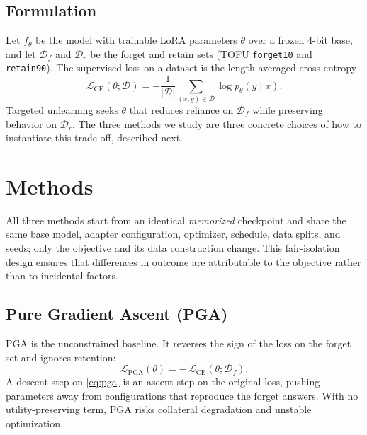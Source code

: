 \documentclass[journal]{IEEEtran}
\begin{document}
\subsection{Formulation}
Let $f_\theta$ be the model with trainable LoRA parameters $\theta$ over a frozen 4-bit base, and let $\mathcal{D}_f$ and $\mathcal{D}_r$ be the forget and retain sets (TOFU \texttt{forget10} and \texttt{retain90}). The supervised loss on a dataset is the length-averaged cross-entropy
\begin{equation}
\mathcal{L}_{\mathrm{CE}}(\theta;\mathcal{D}) = -\frac{1}{|\mathcal{D}|}\sum_{(x,y)\in\mathcal{D}}\log p_\theta(y\mid x).
\label{eq:ce}
\end{equation}
Targeted unlearning seeks $\theta$ that reduces reliance on $\mathcal{D}_f$ while preserving behavior on $\mathcal{D}_r$. The three methods we study are three concrete choices of how to instantiate this trade-off, described next.

\section{Methods}
\label{sec:method}
All three methods start from an identical \emph{memorized} checkpoint and share the same base model, adapter configuration, optimizer, schedule, data splits, and seeds; only the objective and its data construction change. This fair-isolation design ensures that differences in outcome are attributable to the objective rather than to incidental factors.

\subsection{Pure Gradient Ascent (PGA)}
PGA is the unconstrained baseline. It reverses the sign of the loss on the forget set and ignores retention:
\begin{equation}
\mathcal{L}_{\mathrm{PGA}}(\theta) = -\,\mathcal{L}_{\mathrm{CE}}(\theta;\mathcal{D}_f).
\label{eq:pga}
\end{equation}
A descent step on \eqref{eq:pga} is an ascent step on the original loss, pushing parameters away from configurations that reproduce the forget answers. With no utility-preserving term, PGA risks collateral degradation and unstable optimization.
\end{document}
